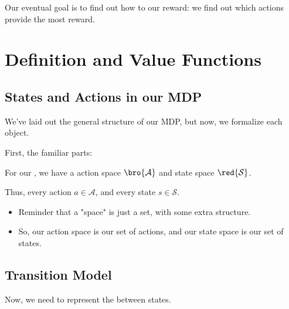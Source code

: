         Our eventual goal is to find out how to  our reward: we find out which actions provide the most reward.

        

    

        



\pagebreak
    
\section{Definition and Value Functions}

    \subsection{States and Actions in our MDP}

        We've laid out the general structure of our MDP, but now, we formalize each object.
    
        First, the familiar parts:\\
    
        \begin{definition}
            For our , we have a  action space $\bro{\mathcal{A}}$ and state space $\red{\mathcal{S}}$.
    
            Thus, every action $a \in \mathcal{A}$, and every state $s \in \mathcal{S}$.
        \end{definition}
    

        \begin{itemize}
            \item Reminder that a "space" is just a set, with some extra structure.
            \item So, our action space is our set of actions, and our state space is our set of states.
        \end{itemize}


    \pagebreak            
    
    \subsection{Transition Model}
    
        Now, we need to represent the  between states.
    
